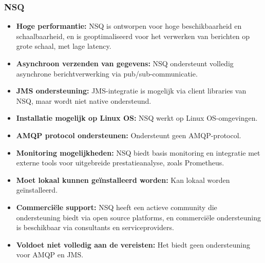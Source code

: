 \subsubsection{NSQ}
\begin{itemize}
    \item \textbf{Hoge performantie:} NSQ is ontworpen voor hoge beschikbaarheid en schaalbaarheid, en is geoptimaliseerd voor het verwerken van berichten op grote schaal, met lage latency.
    \item \textbf{Asynchroon verzenden van gegevens:} NSQ ondersteunt volledig asynchrone berichtverwerking via pub/sub-communicatie.
    \item \textbf{JMS ondersteuning:} JMS-integratie is mogelijk via client libraries van NSQ, maar wordt niet native ondersteund.
    \item \textbf{Installatie mogelijk op Linux OS:} NSQ werkt op Linux OS-omgevingen.
    \item \textbf{AMQP protocol ondersteunen:} Ondersteunt geen AMQP-protocol.
    \item \textbf{Monitoring mogelijkheden:} NSQ biedt basis monitoring en integratie met externe tools voor uitgebreide prestatieanalyse, zoals Prometheus.
    \item \textbf{Moet lokaal kunnen geïnstalleerd worden:} Kan lokaal worden geïnstalleerd.
    \item \textbf{Commerciële support:} NSQ heeft een actieve community die ondersteuning biedt via open source platforms, en commerciële ondersteuning is beschikbaar via consultants en serviceproviders.
    \item \textbf{Voldoet niet volledig aan de vereisten:} Het biedt geen ondersteuning voor AMQP en JMS.
\end{itemize}
 
  
